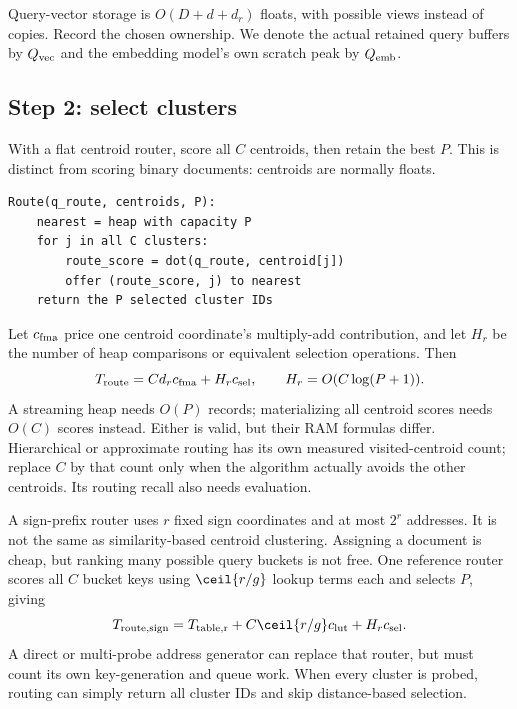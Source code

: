 Query-vector storage is $O(D+d+d_r)$ floats, with possible views instead of copies. Record the
chosen ownership. We denote the actual retained query buffers by $Q_{\rm vec}$ and the
embedding model's own scratch peak by $Q_{\rm emb}$.

\subsection{Step 2: select clusters}
With a flat centroid router, score all $C$ centroids, then retain the best $P$. This is distinct
from scoring binary documents: centroids are normally floats.
\par\noindent\begin{minipage}{\linewidth}
\begin{lstlisting}[caption={A simple flat centroid router with bounded selection memory.}]
Route(q_route, centroids, P):
    nearest = heap with capacity P
    for j in all C clusters:
        route_score = dot(q_route, centroid[j])
        offer (route_score, j) to nearest
    return the P selected cluster IDs
\end{lstlisting}
\end{minipage}\par
Let $c_{\rm fma}$ price one centroid coordinate's multiply-add contribution, and let
$H_r$ be the number of heap comparisons or equivalent selection operations. Then
\begin{equation}
T_{\rm route}=C d_r c_{\rm fma}+H_r c_{\rm sel},\qquad
H_r=O(C\log(P+1)).
\label{eq:route}
\end{equation}
A streaming heap needs $O(P)$ records; materializing all centroid scores needs $O(C)$ scores
instead. Either is valid, but their RAM formulas differ. Hierarchical or approximate routing
has its own measured visited-centroid count; replace $C$ by that count only when the algorithm
actually avoids the other centroids. Its routing recall also needs evaluation.

A sign-prefix router uses $r$ fixed sign coordinates and at most $2^r$ addresses. It is not the
same as similarity-based centroid clustering. Assigning a document is cheap, but ranking many
possible query buckets is not free. One reference router scores all $C$ bucket keys using
$\ceil{r/g}$ lookup terms each and selects $P$, giving
\[
T_{\rm route,sign}=T_{\rm table,r}+C\ceil{r/g}c_{\rm lut}+H_r c_{\rm sel}.
\]
A direct or multi-probe address generator can replace that router, but must count its own
key-generation and queue work. When every cluster is probed, routing can simply return all
cluster IDs and skip distance-based selection.

